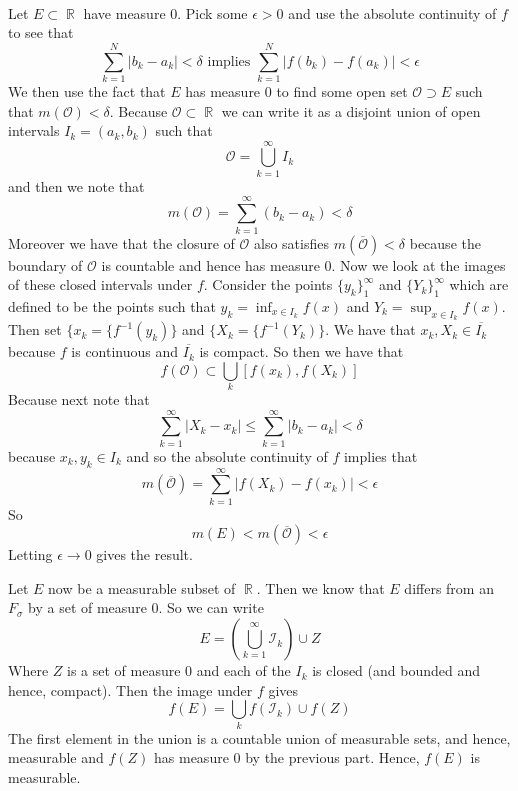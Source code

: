 \documentclass{article}
\DeclareMathOperator{\R}{\mathbb{R}}
\newcommand{\problem}[1]{\noindent{\textbf{Problem #1}}\\}
\newcommand{\problempart}[1]{\noindent{\textbf{(#1)}}}
\begin{document}
\problem{3.5.19}
\problempart{a} Let $E \subset \R$ have measure 0. Pick some $\epsilon > 0$ and use the absolute continuity of $f$ to see that 
\[
\sum_{k=1}^N |b_k - a_k| < \delta \text{ implies } \sum_{k=1}^N |f(b_k) - f(a_k)| < \epsilon
\] 
We then use the fact that $E$ has measure 0 to find some open set $\mathcal{O} \supset E$ such that $m(\mathcal{O}) < \delta$. Because $\mathcal{O} \subset \R$ we can write it as a disjoint union of open intervals $I_k = (a_k, b_k)$ such that
\[
\mathcal{O} = \bigcup_{k=1}^\infty I_k
\]
and then we note that 
\[
m(\mathcal{O}) = \sum_{k=1}^\infty (b_k - a_k) < \delta
\]
Moreover we have that the closure of $\mathcal{O}$ also satisfies $m(\overline{\mathcal{O}}) < \delta$ because the boundary of $\mathcal{O}$ is countable and hence has measure 0. Now we look at the images of these closed intervals under $f$. Consider the points $\{y_k\}_{1}^\infty$ and $\{Y_k\}_{1}^\infty$ which are defined to be the points such that $y_k = \inf_{x \in I_k} f(x)$ and $Y_k = \sup_{x \in I_k} f(x)$. Then set $\{x_k = \{f^{-1}(y_k)\}$ and $\{X_k = \{f^{-1}(Y_k)\}$. We have that $x_k,X_k \in \overline{I_k}$ because $f$ is continuous and $\overline{I_k}$ is compact. So then we have that
\[
f(\mathcal{O}) \subset \bigcup_k [f(x_k), f(X_k)]
\]
Because next note that
\[
\sum_{k=1}^\infty |X_k - x_k| \leq \sum_{k=1}^\infty |b_k - a_k| < \delta
\] 
because $x_k,y_k \in I_k$ and so the absolute continuity of $f$ implies that 
\[
m(\overline{\mathcal{O}}) = \sum_{k=1}^\infty |f(X_k) - f(x_k)| < \epsilon
\]
So 
\[
m(E) < m(\overline{\mathcal{O}}) < \epsilon
\] 
Letting $\epsilon \to 0$ gives the result. 

\problempart{b} Let $E$ now be a measurable subset of $\R$. Then we know that $E$ differs from an $F_\sigma$ by a set of measure 0. So we can write
\[
E = \left(\bigcup_{k=1}^\infty \mathcal{I}_k\right) \cup Z
\]
Where $Z$ is a set of measure 0 and each of the $I_k$ is closed (and bounded and hence, compact). Then the image under $f$ gives
\[
f(E) = \bigcup_k f(\mathcal{I}_k) \cup f(Z)
\]
The first element in the union is a countable union of measurable sets, and hence, measurable and $f(Z)$ has measure 0 by the previous part. Hence, $f(E)$ is measurable. 
\end{document}
